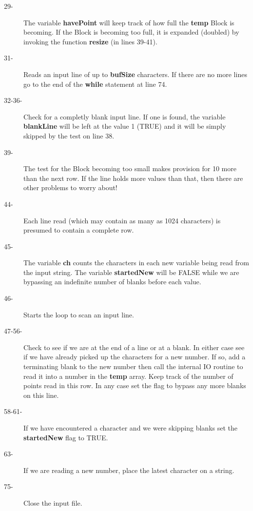 \begin{description}
\item[29-] The variable {\bf havePoint} will keep track of how full the {\bf temp}
Block is becoming. If the Block is becoming too full, it is expanded 
(doubled) by 
invoking the function {\bf resize} (in lines 39-41).

\item[31-] Reads an input line of up to {\bf bufSize} characters.
If there are no more lines go to the end of the
{\bf while} statement at line 74.

\item[32-36-] Check for a completly blank input line.  If one is found, the variable
{\bf blankLine} will be left at the value 1 (TRUE) and it will be simply skipped
by the test on line 38.

\item[39-] The test for the Block becoming too small makes provision for 10 more than
the next row. If the line holds more values than that, then there are other
problems to worry about!

\item[44-] Each line read (which may contain as many as 1024 characters) is presumed
to contain a complete row. 

\item[45-] The variable {\bf ch} counts the characters in each new variable being
read from the input string.  The variable {\bf startedNew} will be FALSE while 
we are bypassing
an indefinite number of blanks before each value. 

\item[46-] Starts the loop to scan an input line.

\item[47-56-] Check to see if we are at the end of a line or at a blank.  In either 
case see if we have already picked up the characters for a new number. If so,
add a terminating blank to the new number then call the internal IO routine 
to read it into a number in the {\bf temp} array.  Keep track of the number of
points read in this row.  In any case set the flag to bypass any more
blanks on this line.

\item[58-61-] If we have encountered a character and we were skipping blanks set the
{\bf startedNew} flag to TRUE.

\item[63-] If we are reading a new number, place the latest character on a string.

\item[75-] Close the input file.


\end{description}
